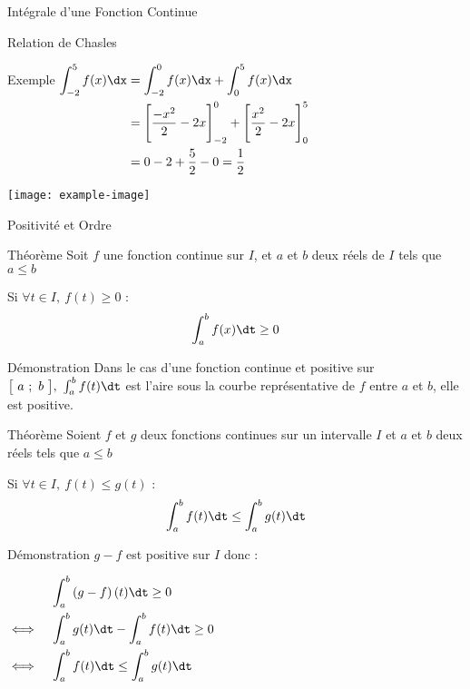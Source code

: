\documentclass{cours}
\begin{document}
\begin{Gpartie}{Intégrale d'une Fonction Continue}
\begin{Spartie}{Relation de Chasles}
\begin{SSpartie}{Exemple}
                $\begin{aligned}[t]
                    \int_{-2}^5f(x)\dx &= \int_{-2}^0f(x)\dx+\int_0^5f(x)\dx \\
                    &= \Bigg[\frac{-x^2}{2}-2x\Bigg]_{-2}^0+\Bigg[\frac{x^2}{2}-2x\Bigg]_0^5 \\
                    &= 0-2+\frac{5}{2}-0=\frac{1}{2} 
                \end{aligned}$
                \begin{center}
                        \texttt{[image: example-image]}
                    \parbox{\linewidth}{}
                \end{center}
            \end{SSpartie}
        \end{Spartie}
        \pagebreak
        \begin{Spartie}{Positivité et Ordre} 
            \begin{SSpartie}{Théorème} 
                Soit $f$ une fonction continue sur $I$, et $a$ et $b$ deux réels de $I$ tels que $a\leq b$

                Si $\forall t\in I,~f(t)\geq0$ : \[\int_a^b f(x)\dt\geq0\]
                \begin{SSSpartie}{Démonstration} 
                    Dans le cas d'une fonction continue et positive sur $\big[~a~;~b~\big],~\int_a^b f(t)\dt$ est l'aire sous la courbe représentative de $f$ entre $a$ et $b$, elle est positive.
                \end{SSSpartie}
            \end{SSpartie}
            \begin{SSpartie}{Théorème} 
                Soient $f$ et $g$ deux fonctions continues sur un intervalle $I$ et $a$ et $b$ deux réels tels que $a\leq b$

                Si $\forall t\in I,~f(t)\leq g(t)$ : \[\int_a^b f(t)\dt\leq\int_a^bg(t)\dt\]
                \begin{SSSpartie}{Démonstration} 
                    $g-f$ est positive sur $I$ donc : 

                    $\begin{aligned}[t]
                        &\quad\int_a^b\left(g-f\right)(t)\dt\geq 0 \\
                        \iff&\quad\int_a^b g(t)\dt-\int_a^b f(t)\dt\geq 0 \\
                        \iff&\quad\int_a^b f(t)\dt\leq\int_a^b g(t)\dt
                    \end{aligned}$
                \end{SSSpartie}
            \end{SSpartie}
        \end{Spartie}
    \end{Gpartie}
\end{document}
